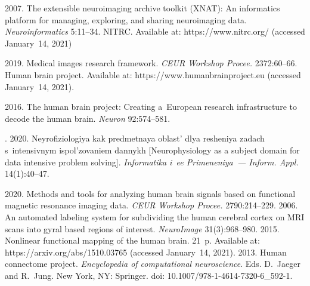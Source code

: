\vspace*{3pt}

  \begin{multicols}{2}

\renewcommand{\bibname}{\protect\rmfamily References}

{\small\frenchspacing
 {%
 \begin{thebibliography}{99}
 
 \vspace*{-3pt}
 
 2007. The 
extensible neuroimaging archive toolkit (XNAT): An informatics platform for 
managing, exploring, and sharing neuroimaging data. \textit{Neuroinformatics} 
5:11--34.
NITRC. Available at: {\sf https://www.nitrc.org/} (accessed 
January~14, 2021)

 2019. Medical images 
research framework. \textit{CEUR Workshop Procee.} 2372:60--66. 
Human brain project. Available at: {\sf 
https://www.\linebreak humanbrainproject.eu} (accessed January~14, 2021).

2016. The human brain project: Creating a~European research infrastructure to 
decode the human brain. \textit{Neuron} 92:574--581.

. 
2020. Neyrofiziologiya kak predmetnaya oblast' dlya resheniya zadach 
s~intensivnym ispol'zovaniem dannykh [Neurophysiology as a subject domain for 
data intensive problem solving]. \textit{Informatika i~ee Primeneniya~--- Inform. 
Appl.} 14(1):40--47.

\columnbreak


 2020. Methods 
and tools for analyzing human brain signals based on functional magnetic 
resonance imaging data. \textit{CEUR Workshop Procee.} 2790:214--229. 
 2006. An automated 
labeling system for subdividing the human cerebral cortex on MRI scans into gyral 
based regions of interest. \textit{NeuroImage} 31(3):968--980.
 2015. Nonlinear 
functional mapping of the human brain. 21~p. Available at: {\sf 
https://arxiv.org/abs/1510.03765} (accessed January~14, 2021).
 2013. Human connectome project. \textit{Encyclopedia of 
computational neuroscience}. Eds. D.~Jaeger and R.~Jung. New York, NY: Springer. 
doi: 10.1007/978-1-4614-7320-6\_592-1.

\end{thebibliography}

 }
 }

\end{multicols}


